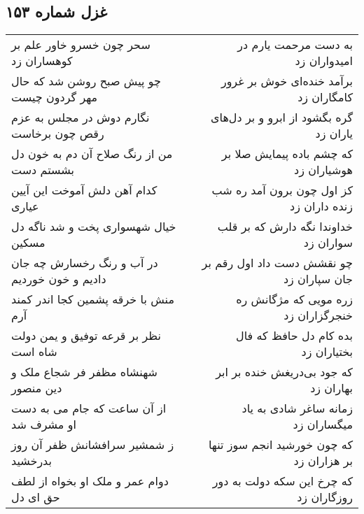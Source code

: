 \begin{center}
\section*{غزل شماره ۱۵۳}
\label{sec:sh153}
\begin{longtable}{l p{0.5cm} r}
سحر چون خسرو خاور علم بر کوهساران زد
&&
به دست مرحمت یارم در امیدواران زد
\\
چو پیش صبح روشن شد که حال مهر گردون چیست
&&
برآمد خنده‌ای خوش بر غرور کامگاران زد
\\
نگارم دوش در مجلس به عزم رقص چون برخاست
&&
گره بگشود از ابرو و بر دل‌های یاران زد
\\
من از رنگ صلاح آن دم به خون دل بشستم دست
&&
که چشم باده پیمایش صلا بر هوشیاران زد
\\
کدام آهن دلش آموخت این آیین عیاری
&&
کز اول چون برون آمد ره شب زنده داران زد
\\
خیال شهسواری پخت و شد ناگه دل مسکین
&&
خداوندا نگه دارش که بر قلب سواران زد
\\
در آب و رنگ رخسارش چه جان دادیم و خون خوردیم
&&
چو نقشش دست داد اول رقم بر جان سپاران زد
\\
منش با خرقه پشمین کجا اندر کمند آرم
&&
زره مویی که مژگانش ره خنجرگزاران زد
\\
نظر بر قرعه توفیق و یمن دولت شاه است
&&
بده کام دل حافظ که فال بختیاران زد
\\
شهنشاه مظفر فر شجاع ملک و دین منصور
&&
که جود بی‌دریغش خنده بر ابر بهاران زد
\\
از آن ساعت که جام می به دست او مشرف شد
&&
زمانه ساغر شادی به یاد میگساران زد
\\
ز شمشیر سرافشانش ظفر آن روز بدرخشید
&&
که چون خورشید انجم سوز تنها بر هزاران زد
\\
دوام عمر و ملک او بخواه از لطف حق ای دل
&&
که چرخ این سکه دولت به دور روزگاران زد
\\
\end{longtable}
\end{center}
